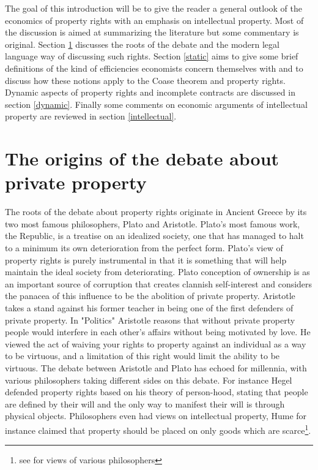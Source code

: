 \documentclass[12pt]{report}
\numberwithin{equation}{section}
\begin{document}
The goal of this introduction will be to give the reader a general outlook of the economics of property rights with an emphasis on intellectual property. Most of the discussion is aimed at summarizing the literature but some commentary is original. Section \ref{origins} discusses the roots of the debate and the modern legal language way of discussing such rights. Section \ref{static} aims to give some brief definitions of the kind of efficiencies economists concern themselves with and to discuss how these notions apply to the Coase theorem and property rights. Dynamic aspects of property rights and incomplete contracts are discussed in section \ref{dynamic}. Finally some comments on economic arguments of intellectual property are reviewed in section \ref{intellectual}.



\section{The origins of the debate about private property} \label{origins}

The roots of the debate about property rights originate in Ancient Greece by its two most famous philosophers, Plato and Aristotle. 
Plato's most famous work, the Republic, is a treatise on an idealized society, one that has managed to halt to a minimum its own deterioration from the perfect form. Plato's view of property rights is purely instrumental in that it is something that will help maintain the ideal society from deteriorating. Plato conception of ownership is as an important source of corruption that creates clannish self-interest and considers the panacea of this influence to be the abolition of private property. Aristotle takes a stand against his former teacher in being one of the first defenders of private property. In "Politics"  Aristotle reasons that without private property people would interfere in each other’s affairs without being motivated by love. He viewed the act of waiving your rights to property against an individual as a way to be virtuous, and a limitation of this right would limit the ability to be virtuous. The debate between Aristotle and Plato has echoed for millennia, with various philosophers taking different sides on this debate. For instance Hegel defended property rights based on his theory of person-hood, stating that people are defined by their will and the only way to manifest their will is through physical objects. Philosophers even had views on intellectual property, Hume for instance claimed that property should be placed on only goods which are scarce\footnote{see \cite{plant1934economic} for views of various philosophers}.
\end{document}
